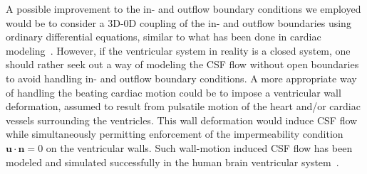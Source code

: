 \documentclass[fleqn]{wlscirep}
\newcommand{\nn}{\mathbf{n}}
\newcommand{\uu}{\mathbf{u}}
\begin{document}
A possible improvement to the in- and outflow boundary conditions we employed would be
to consider a 3D-0D coupling of the in- and outflow boundaries using ordinary differential equations,
similar to what has been done in cardiac modeling~\cite{Brown2024AMechanics, Augustin2021ACirculation}.
However, if the ventricular system in reality is a closed system,
one should rather seek out a way of modeling the CSF flow without open boundaries to avoid
handling in- and outflow boundary conditions. A more appropriate way of handling the beating
cardiac motion could be to impose a ventricular wall deformation, assumed to result from pulsatile
motion of the heart and/or cardiac vessels surrounding the ventricles. This wall deformation would
induce CSF flow while simultaneously permitting enforcement of the impermeability condition
$\uu\cdot\nn=0$ on the ventricular walls. Such wall-motion induced CSF flow has been modeled and
simulated successfully in the human brain ventricular system~\cite{Causemann2022HumanFramework,
Kurtcuoglu2005ComputationalSystem, Kurtcuoglu2007ComputationalSylvius, Linninger2005PulsatileBrain}.
\end{document}
